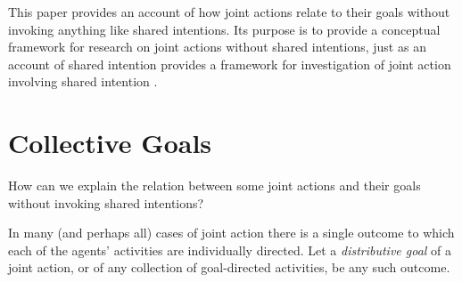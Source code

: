 \documentclass[12pt,a4paper]{extarticle}
\begin{document}
This paper provides an account of how joint actions relate to their goals without invoking anything like shared intentions.  
Its purpose is to provide a conceptual framework for research on joint actions without shared intentions, just as an account of shared intention provides a framework for investigation of joint action involving shared intention \citep{Bratman:2009lv}.  






\section{Collective Goals}
\label{section_collective}

How can we explain the relation between some joint actions and  their goals without invoking shared intentions?  

In many (and perhaps all) cases of joint action there is a single outcome to which each of the agents' activities are individually directed.  Let a \emph{distributive goal} of a joint action, or of any collection of goal-directed activities, be any such outcome.  
\end{document}
